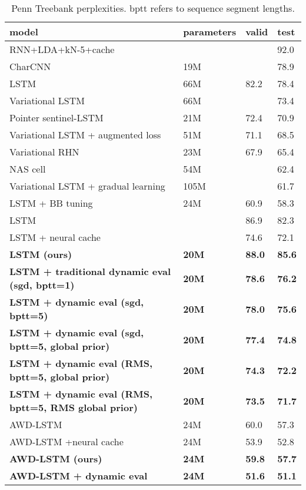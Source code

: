 \documentclass{article} \usepackage{iclr2018_conference,times}
\begin{document}
\begin{table}[tb]
\begin{center} 
\begin{tabular}{  l  l  l  l } \toprule 
model & parameters & valid & test  \\ 
\midrule 
RNN+LDA+kN-5+cache \citep{Mikolov2012b}& & & 92.0 \\ 
CharCNN \citep{Kim2015} & 19M & & 78.9 \\
LSTM \citep{Zaremba-2014} & 66M & 82.2 & 78.4 \\
Variational LSTM \citep{gal2016} &66M & & 73.4 \\
Pointer sentinel-LSTM \citep{Merity2016} &21M & 72.4 & 70.9 \\
Variational LSTM + augmented loss \citep{inan2017}& 51M &71.1 & 68.5 \\
Variational RHN \citep{zilly2017}& 23M & 67.9 & 65.4\\
NAS cell  \citep{zoph2017} &54M & & 62.4 \\
Variational LSTM + gradual learning \citep{aharoni2017} & 105M & & 61.7 \\
LSTM + BB tuning \citep{melis2017}& 24M & 60.9 & 58.3 \\
\midrule
LSTM \citep{grave2017}& & 86.9 & 82.3 \\
LSTM + neural cache \citep{grave2017}& & 74.6 & 72.1 \\
\textbf{LSTM (ours)} & \textbf{20M} & \textbf{88.0} & \textbf{85.6} \\
\textbf{LSTM + traditional dynamic eval (sgd, bptt=1)}& \textbf{20M} & \textbf{78.6} & \textbf{76.2}\\
\textbf{LSTM + dynamic eval (sgd, bptt=5)}& \textbf{20M} & \textbf{78.0} & \textbf{75.6}\\
\textbf{LSTM + dynamic eval (sgd, bptt=5, global prior)}& \textbf{20M} & \textbf{77.4} & \textbf{74.8}\\
\textbf{LSTM + dynamic eval (RMS, bptt=5, global prior)}& \textbf{20M} & \textbf{74.3} & \textbf{72.2}\\
\textbf{LSTM + dynamic eval (RMS, bptt=5, RMS global prior)}& \textbf{20M} & \textbf{73.5} & \textbf{71.7}\\
\midrule
AWD-LSTM \citep{merity2017}& 24M & 60.0 & 57.3 \\
AWD-LSTM +neural cache \citep{merity2017}& 24M & 53.9 & 52.8 \\
\textbf{AWD-LSTM (ours)} & \textbf{24M} & \textbf{59.8} & \textbf{57.7} \\
\textbf{AWD-LSTM + dynamic eval}& \textbf{24M} & \textbf{51.6} & \textbf{51.1}\\
\bottomrule
\end{tabular} 
\end{center}
\caption{Penn Treebank perplexities. bptt refers to sequence segment lengths.}
\label{tab:ptb}
\end{table}
\end{document}
